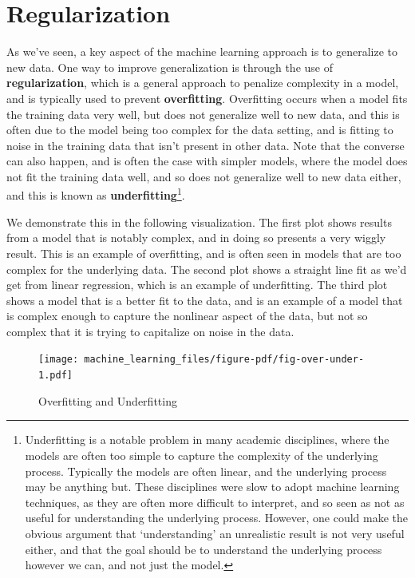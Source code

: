 \documentclass[
  letterpaper,
]{krantz}
\begin{document}
\section{Regularization}\label{regularization}

As we've seen, a key aspect of the machine learning approach is to
generalize to new data. One way to improve generalization is through the
use of \textbf{regularization}, which is a general approach to penalize
complexity in a model, and is typically used to prevent
\textbf{overfitting}. Overfitting occurs when a model fits the training
data very well, but does not generalize well to new data, and this is
often due to the model being too complex for the data setting, and is
fitting to noise in the training data that isn't present in other data.
Note that the converse can also happen, and is often the case with
simpler models, where the model does not fit the training data well, and
so does not generalize well to new data either, and this is known as
\textbf{underfitting}\footnote{Underfitting is a notable problem in many
  academic disciplines, where the models are often too simple to capture
  the complexity of the underlying process. Typically the models are
  often linear, and the underlying process may be anything but. These
  disciplines were slow to adopt machine learning techniques, as they
  are often more difficult to interpret, and so seen as not as useful
  for understanding the underlying process. However, one could make the
  obvious argument that `understanding' an unrealistic result is not
  very useful either, and that the goal should be to understand the
  underlying process however we can, and not just the model.}.

We demonstrate this in the following visualization. The first plot shows
results from a model that is notably complex, and in doing so presents a
very wiggly result. This is an example of overfitting, and is often seen
in models that are too complex for the underlying data. The second plot
shows a straight line fit as we'd get from linear regression, which is
an example of underfitting. The third plot shows a model that is a
better fit to the data, and is an example of a model that is complex
enough to capture the nonlinear aspect of the data, but not so complex
that it is trying to capitalize on noise in the data.

\begin{figure}

{\centering \texttt{[image: machine\_learning\_files/figure-pdf/fig-over-under-1.pdf]}

}

\caption{\label{fig-over-under}Overfitting and Underfitting}

\end{figure}
\end{document}
